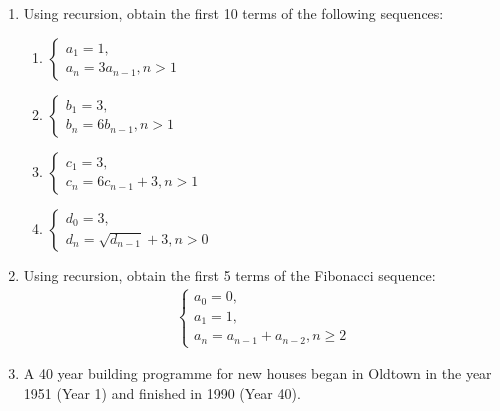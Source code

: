 \begin{enumerate}

\item 

Using recursion, obtain the first 10 terms of the following sequences:
\begin{enumerate}

\item 

\(\left\{\begin{array}{l}a_1 = 1,\\a_n = 3a_{n - 1}, n > 1\end{array}\right.\)

\item 

\(\left\{\begin{array}{l}b_1 = 3,\\b_n = 6b_{n - 1}, n > 1\end{array}\right.\)

\item 

\(\left\{\begin{array}{l}c_1 = 3,\\c_n = 6c_{n - 1} + 3, n > 1\end{array}\right.\)

\item 

\(\left\{\begin{array}{l}d_0 = 3,\\d_n = \sqrt{d_{n - 1}} + 3, n > 0\end{array}\right.\)

\end{enumerate}

\item 

Using recursion, obtain the first 5 terms of the Fibonacci sequence:
\begin{equation*}
\begin{split}
   \left\{
       \begin{array}{l}
           a_0 = 0,\\
           a_1 = 1,\\
           a_n = a_{n - 1} + a_{n - 2}, n \geq 2
       \end{array}
   \right.
   \end{split}
\end{equation*}
\item 

A 40 year building programme for new houses began in Oldtown in the year 1951 (Year 1) and finished in 1990 (Year 40).



\end{enumerate}
